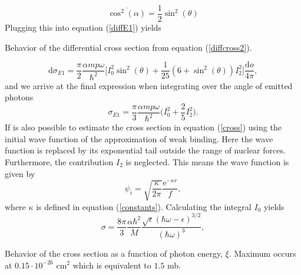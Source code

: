 \begin{equation} 
    \overline{\cos^2(\alpha)} = \frac{1}{2}\sin^2(\theta)
\end{equation}
Plugging this into equation (\ref{diffE1}) yields
\begin{marginfigure}
\centering
{}
\caption{Behavior of the differential cross section from equation (\ref{diffcross2}).}
\end{marginfigure}
\begin{equation} \label{diffcross2}
    \textrm{d}\sigma_{E1} = \frac{\pi}{2}\frac{\alpha m p \omega}{\hbar^2} \Big[I_0^2 \sin^2(\theta)+\frac{1}{25}(6+\sin^2(\theta))I_2^2 \Big] \frac{\textrm{d}o}{4\pi},
\end{equation}
and we arrive at the final expression when integrating over the angle of emitted photons
\begin{equation} \label{cross}
    \sigma_{E1} = \frac{\pi}{3}\frac{\alpha m p \omega}{\hbar^2} \Big( I_0^2+\frac{2}{5}I_2^2\Big).
\end{equation}
If is also possible to estimate the cross section in equation (\ref{cross}) using the initial wave function of the approximation of weak binding. Here the wave function is replaced by its exponential tail outside the range of nuclear forces. Furthermore, the contribution $I_2$ is neglected. This means the wave function is given by
\begin{equation}
    \psi_i = \sqrt{\frac{\kappa}{2\pi}} \frac{\textrm{e}^{-\kappa r}}{f},
\end{equation}
where $\kappa$ is defined in equation (\ref{constants}). Calculating the integral $I_0$ yields
\begin{equation}
    \sigma = \frac{8\pi}{3} \frac{\alpha\hbar^2}{M}\frac{\sqrt{\epsilon}(\hbar\omega-\epsilon)^{3/2}}{(\hbar\omega)^3},
\end{equation}
\begin{marginfigure}

\caption{Behavior of the cross section as a function of photon energy, $\xi$. Maximum occurs at $0.15\cdot10^{-26}$ cm$^2$ which is equivalent to $1.5$ mb. }
\end{marginfigure}


